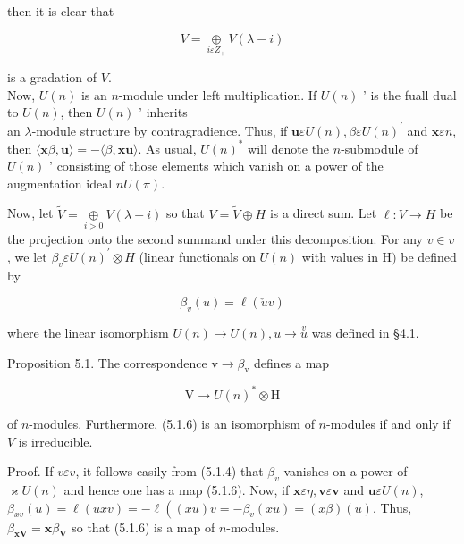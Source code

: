 \documentclass[10pt]{article}
\begin{document}
then it is clear that


\begin{equation*}
V=\underset{i \varepsilon Z_{+}}{\oplus} V(\lambda-i) \tag{5.1.4}
\end{equation*}


is a gradation of $V$.\\
Now, $U(n)$ is an $n$-module under left multiplication. If $U(n)$ ' is the fuall dual to $U(n)$, then $U(n)$ ' inherits\\
an $\lambda$-module structure by contragradience. Thus, if $\mathbf{u} \varepsilon U(n), \beta \varepsilon U(n)^{\prime}$ and $\mathbf{x} \varepsilon n$, then $\langle\mathbf{x} \beta, \mathbf{u}\rangle=-\langle\beta, \mathbf{x u}\rangle$. As usual, $U(n)^{*}$ will denote the $n$-submodule of $U(n)$ ' consisting of those elements which vanish on a power of the augmentation ideal $n U(\pi)$.

Now, let $\tilde{V}=\underset{i>0}{\oplus} V(\lambda-i)$ so that $V=\tilde{V} \oplus H$ is a direct sum. Let $\ell: V \rightarrow H$ be the projection onto the second summand under this decomposition. For any $v \in v$, we let $\beta_{v} \varepsilon U(n)^{\prime} \otimes H$ (linear functionals on $U(n)$ with values in H$)$ be defined by


\begin{equation*}
\beta_{v}(u)=\ell(\check{u} v) \tag{5.1.5}
\end{equation*}


where the linear isomorphism $U(n) \rightarrow U(n), u \rightarrow \stackrel{v}{u}$ was defined in §4.1.

Proposition 5.1. The correspondence $\mathrm{v} \rightarrow \beta_{\mathrm{v}}$ defines a map


\begin{equation*}
\mathrm{V} \rightarrow U(n)^{*} \otimes \mathrm{H} \tag{5.1.6}
\end{equation*}


of $n$-modules. Furthermore, (5.1.6) is an isomorphism of $n$-modules if and only if $V$ is irreducible.

Proof. If $v \varepsilon v$, it follows easily from (5.1.4) that $\beta_{v}$ vanishes on a power of $\varkappa U(n)$ and hence one has a map (5.1.6). Now, if $\mathbf{x} \varepsilon \eta, \mathbf{v} \varepsilon \mathbf{v}$ and $\mathbf{u} \varepsilon U(n)$, $\beta_{x v}(u)=\ell(u x v)=-\ell\left((x u) v=-\beta_{v}(x u)=(x \beta)(u)\right.$. Thus, $\beta_{\mathbf{x V}}=\mathbf{x} \beta_{\mathbf{V}}$ so that (5.1.6) is a map of $n$-modules.
\end{document}
